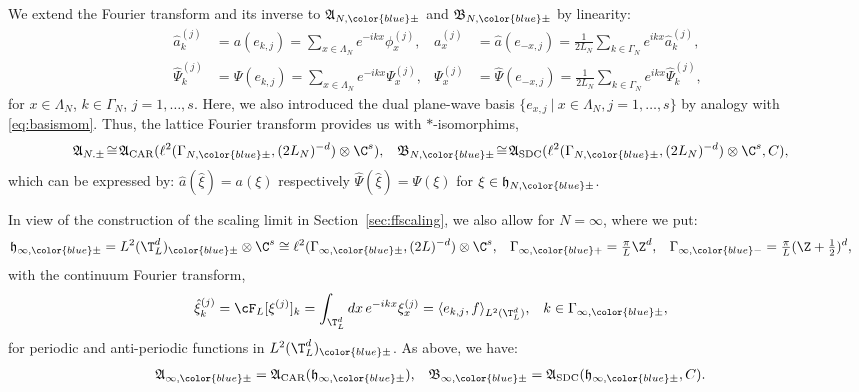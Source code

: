 \documentclass[a4paper, 11pt]{article}
\newcommand{\fA}{\mathfrak{A}}\newcommand{\cA}{\mathcal{A}}\newcommand{\dA}{\mathds{A}}\newcommand{\sA}{\mathscr{A}}
\newcommand{\fB}{\mathfrak{B}}\newcommand{\cB}{\mathcal{B}}\newcommand{\dB}{\mathds{B}}\newcommand{\sB}{\mathscr{B}}
\newcommand{\fh}{\mathfrak{h}}
\newcommand{\ltwo}{\ell^{2}}
\DeclareMathOperator{\1}{\mathds{1}}
\DeclareMathOperator{\CAR}{\textup{CAR}}
\DeclareMathOperator{\SDC}{\textup{SDC}}
\begin{document}
We extend the Fourier transform and its inverse to $\fA_{N, {\color{blue}\pm}}$ and $\fB_{N, {\color{blue}\pm}}$ by linearity:
\begin{align}
\label{eq:Ffields}
\hat{a}^{(j)}_{k} & = a(e_{k,j}) = \sum_{x\in\Lambda_{N}}e^{-ikx}\phi^{(j)}_{x}, & a^{(j)}_{x} & = \hat{a}(e_{-x,j}) = \tfrac{1}{2L_{N}}\sum_{k\in\Gamma_{N}}e^{ikx}\hat{a}^{(j)}_{k},  \\ \nonumber
\hat{\Psi}^{(j)}_{k} & = \Psi(e_{k,j}) = \sum_{x\in\Lambda_{N}}e^{-ikx}\Psi^{(j)}_{x}, & \Psi^{(j)}_{x} & = \hat{\Psi}(e_{-x,j}) = \tfrac{1}{2L_{N}}\sum_{k\in\Gamma_{N}}e^{ikx}\hat{\Psi}^{(j)}_{k},
\end{align}
for $x\in\Lambda_{N}$, $k\in\Gamma_{N}$, $j =1,\dots,s$. Here, we also introduced the dual plane-wave basis $\{e_{x,j}\ |\ x\in\Lambda_{N}, j=1,\dots,s\}$ by analogy with \eqref{eq:basismom}. Thus, the lattice Fourier transform provides us with $*$-isomorphims,
\begin{align}
\label{eq:Ffermi}
\fA_{N.\pm} &\!\cong\!\fA_{\CAR}(\ltwo(\Gamma_{N,{\color{blue}\pm}},(2L_{N})^{-d})\otimes\C^{s}), & \fB_{N,{\color{blue}\pm}} &\!\cong\!\fA_{\SDC}(\ltwo(\Gamma_{N,{\color{blue}\pm}},(2L_{N})^{-d})\otimes\C^{s},C),
\end{align}
which can be expressed by: $\hat{a}(\hat{\xi}) = a(\xi)$ respectively $\hat{\Psi}(\hat{\xi}) = \Psi(\xi)$ for $\xi\in\fh_{N,{\color{blue}\pm}}$.

In view of the construction of the scaling limit in Section \ref{sec:ffscaling}, we also allow for $N=\infty$, where we put:
\begin{align}
\label{eq:1pcont}
\fh_{\infty,{\color{blue}\pm}} & = L^{2}(\T^{d}_{L})_{{\color{blue}\pm}}\otimes\C^{s}\cong\ltwo(\Gamma_{\infty,{\color{blue}\pm}},(2L)^{-d})\otimes\C^{s}, & \Gamma_{\infty,{\color{blue}+}} & = \tfrac{\pi}{L}\Z^{d}, & \Gamma_{\infty,{\color{blue}-}} & = \tfrac{\pi}{L}(\Z+\tfrac{1}{2})^{d},
\end{align}
with the continuum Fourier transform,
\begin{align}
\label{eq:contF}
\hat{\xi}^{(j)}_{k} & = \cF_{L}[\xi^{(j)}]_{k} = \int_{\T^{d}_{L}}dx\!\ e^{-ikx}\xi^{(j)}_{x} = \langle e_{k,j}, f\rangle_{L^{2}(\T^{d}_{L})}, & k & \in\Gamma_{\infty,{\color{blue}\pm}},
\end{align}
for periodic and anti-periodic functions in $L^{2}(\T^{d}_{L})_{{\color{blue}\pm}}$. As above, we have:
\begin{align}
\label{eq:contfermi}
\fA_{\infty,{\color{blue}\pm}} & = \fA_{\CAR}(\fh_{\infty,{\color{blue}\pm}}), & \fB_{\infty,{\color{blue}\pm}} & = \fA_{\SDC}(\fh_{\infty,{\color{blue}\pm}},C). 
\end{align}
\end{document}
